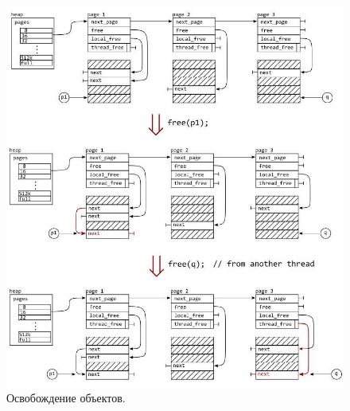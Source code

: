 \begin{figure}[!h]
	\begin{center}
		\includegraphics[scale=0.5]{images/mimalloc-free.jpg}
		\caption{Освобождение объектов.}
		\label{mimalloc-free}
	\end{center}
\end{figure}

